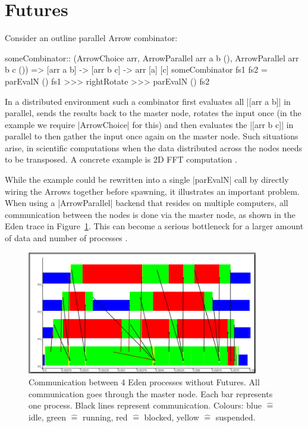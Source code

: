 \section{Futures} \label{sec:futures}\label{futures}
Consider an outline parallel Arrow combinator:
\begin{code}
someCombinator:: (ArrowChoice arr,
	ArrowParallel arr a b (),
	ArrowParallel arr b c ()) =>
	[arr a b] -> [arr b c] -> arr [a] [c]
someCombinator fs1 fs2 =
	parEvalN () fs1 >>>
	rightRotate >>>
	parEvalN () fs2
\end{code}

In a distributed environment such a combinator first evaluates all |[arr a b]| in parallel, sends the results back to the master node, rotates the input once (in the example we require |ArrowChoice| for this) and then evaluates the |[arr b c]| in parallel to then gather the input once again on the master node.
Such situations arise, \eg in scientific computations when the data distributed across the nodes needs to be transposed. A concrete example is 2D FFT computation \cite{Gorlatch,Berthold2009-fft}.

While the example could be rewritten into a single |parEvalN| call by directly wiring the Arrows together before spawning, it illustrates an important problem. When using a |ArrowParallel| backend that resides on multiple computers, all communication between the nodes is done via the master node, as shown in the Eden trace in Figure~\ref{fig:withoutFutures}. This can become a serious bottleneck
for a larger amount of data and number of processes \citep[as e.g.][showcases]{Berthold2009-fft}.
\begin{figure}[ht]
	\centering
	\includegraphics[width=0.9\textwidth]{images/withoutFutures}
	\caption[without Futures]{Communication between 4 Eden processes without Futures. All communication goes through the master node. Each bar represents one process. Black lines represent communication. Colours: blue $\hat{=}$ idle, green $\hat{=}$ running, red  $\hat{=}$ blocked, yellow $\hat{=}$ suspended.}
	\label{fig:withoutFutures}
\end{figure}

